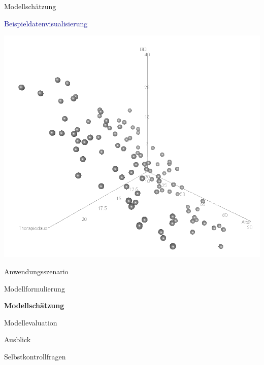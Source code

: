 \documentclass[
  8pt,
  ignorenonframetext,
]{beamer}
\begin{document}
\begin{frame}{Modellschätzung}
\protect\hypertarget{modellschuxe4tzung-1}{}
\vspace{2mm}

\textcolor{darkblue}{Beispieldatenvisualisierung} \vspace{1mm}

\center

\begin{center}\includegraphics[width=0.6\linewidth]{12_Abbildungen/alm_2_beispieldatensatz} \end{center}
\end{frame}

\begin{frame}{}
\protect\hypertarget{section-6}{}
\large
{}
\vfill

Anwendungsszenario

Modellformulierung

\textbf{Modellschätzung}

Modellevaluation

Ausblick

Selbstkontrollfragen \vfill
\end{frame}
\end{document}
